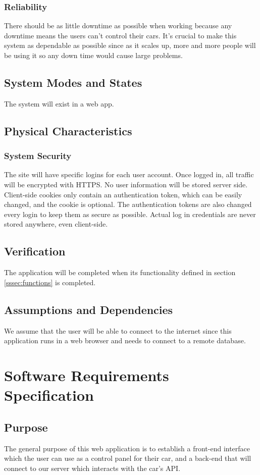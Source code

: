 \documentclass[onecolumn, draftclsnofoot,10pt, compsoc]{IEEEtran}
\begin{document}
\subsubsection{Reliability}
There should be as little downtime as possible when working because any downtime means the users can't control their cars.
It's crucial to make this system as dependable as possible since as it scales up, more and more people will be using it so any down time would cause large problems.
\subsection{System Modes and States}
The system will exist in a web app.
\subsection{Physical Characteristics}
\subsubsection{System Security}
The site will have specific logins for each user account.
Once logged in, all traffic will be encrypted with HTTPS.
No user information will be stored server side. Client-side cookies only contain an authentication token, which can be easily changed, and the cookie is optional. The authentication tokens are also changed every login to keep them as secure as possible. Actual log in credentials are never stored anywhere, even client-side.
\subsection{Verification}
The application will be completed when its functionality defined in section \ref{sssec:functions} is completed.
\subsection{Assumptions and Dependencies}
We assume that the user will be able to connect to the internet since this application runs in a web browser and needs to connect to a remote database.

\section{Software Requirements Specification}

\subsection{Purpose}
The general purpose of this web application is to establish a front-end interface which the user can use as a control panel for their car, and a back-end that will connect to our server which interacts with the car's API\cite{1}.
\end{document}
